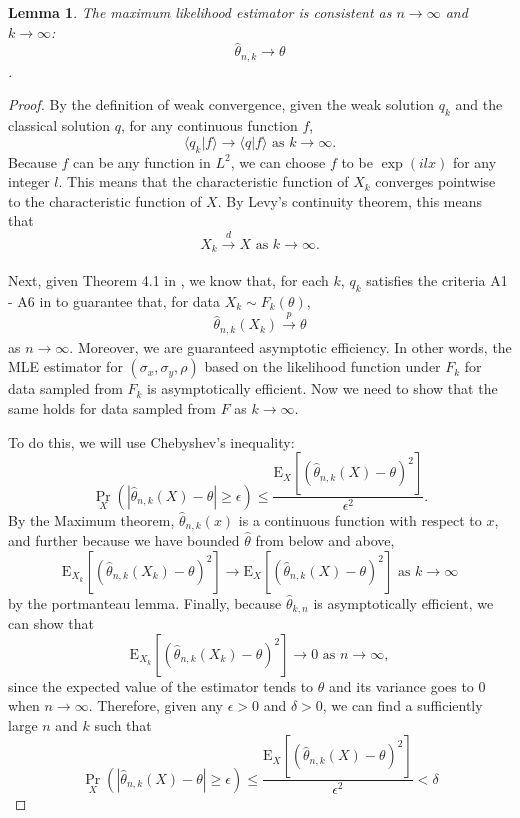 \documentclass[10pt]{article}
\newtheorem{lemma}{Lemma}
\begin{document}
\begin{lemma}
  The maximum likelihood estimator is consistent as $n \to \infty$ and $k \to \infty$:
  \[ \hat{\theta}_{n,k} \to \theta \].
\end{lemma}
\begin{proof}
  By the definition of weak convergence, given the weak solution $q_k$
  and the classical solution $q$, for any continuous function $f$,
  \[ \langle q_k| f \rangle \to \langle q| f \rangle \mbox { as } k
    \to \infty. \]
  Because $f$ can be any function in $L^2$, we can
  choose $f$ to be $\exp(ilx)$ for any integer $l$. This means that
  the characteristic function of $X_k$ converges pointwise to the
  characteristic function of $X$. By Levy's continuity theorem, this
  means that
  \[ X_k \xrightarrow[]{d} X \mbox { as } k \to \infty. \]

  Next, given Theorem 4.1 in \cite{singler2008differentiability}, we
  know that, for each $k$, $q_k$ satisfies the criteria A1 - A6 in 
  \cite{casella2002statistical} to guarantee that, for data
  $X_{k} \sim F_k(\theta)$,
  \[ \hat{\theta}_{n,k}(X_k) \xrightarrow[]{p} \theta \] as
  $n \to \infty$. Moreover, we are guaranteed asymptotic
  efficiency. In other words, the MLE estimator for
  $(\sigma_x, \sigma_y, \rho)$ based on the likelihood function under
  $F_k$ for data sampled from $F_k$ is asymptotically efficient. Now we need to show
  that the same holds for data sampled from $F$ as $k \to \infty$.

  To do this, we will use Chebyshev's inequality:
  \[
    \Pr_{X}\left( \left| \hat{\theta}_{n,k}(X) - \theta \right| \geq
      \epsilon \right) \leq \frac{ \mbox{E}_{X}\left[
        (\hat{\theta}_{n,k}(X) - \theta)^2 \right] }{ \epsilon^2 }.
  \]
  By the Maximum theorem, $\hat{\theta}_{n,k}(x)$ is a continuous
  function with respect to $x$, and further because we have bounded
  $\hat{\theta}$ from below and above,
  \[
    \mbox{E}_{X_k}\left[ (\hat{\theta}_{n,k}(X_k) - \theta)^2 \right]
    \to \mbox{E}_{X}\left[ (\hat{\theta}_{n,k}(X) - \theta)^2 \right]
    \mbox{ as } k \to \infty
  \]
  by the portmanteau lemma. Finally, because $\hat{\theta}_{k,n}$ is
  asymptotically efficient, we can show that
  \[
    \mbox{E}_{X_k}\left[ (\hat{\theta}_{n,k}(X_k) - \theta)^2 \right]
    \to 0 \mbox{ as } n \to \infty,
  \]
  since the expected value of the estimator tends to $\theta$ and its
  variance goes to 0 when $n \to \infty$. Therefore, given any
  $\epsilon > 0$ and $\delta > 0$, we can find a sufficiently large $n$ and $k$ such that
  \[
    \Pr_{X}\left( \left| \hat{\theta}_{n,k}(X) - \theta \right| \geq
      \epsilon \right) \leq \frac{ \mbox{E}_{X}\left[
        (\hat{\theta}_{n,k}(X) - \theta)^2 \right] }{ \epsilon^2 } < \delta    
  \]
\end{proof}




\end{document}
